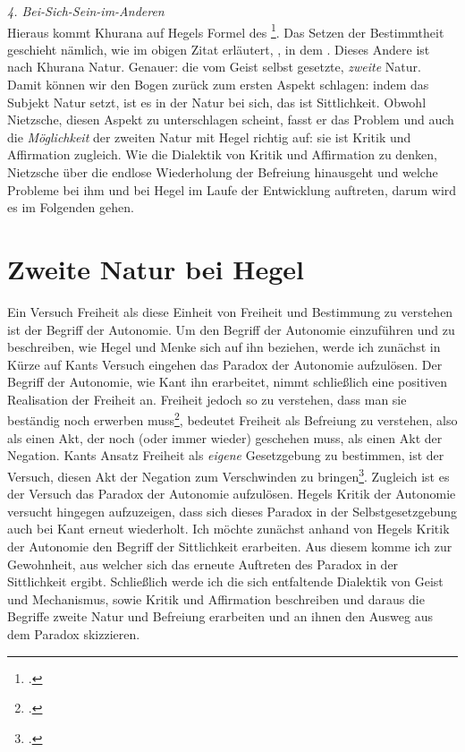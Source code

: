 \documentclass[12pt, a4paper, openany]{report}
\begin{document}
\emph{4. Bei-Sich-Sein-im-Anderen}\\
Hieraus kommt Khurana auf Hegels Formel des \footcite[][283]{khurana_freiheit_2017}.
Das Setzen der Bestimmtheit geschieht nämlich, wie im obigen Zitat erläutert, , in dem . 
Dieses Andere ist nach Khurana Natur. 
Genauer: die vom Geist selbst gesetzte, \emph{zweite} Natur.
Damit können wir den Bogen zurück zum ersten Aspekt schlagen: 
indem das Subjekt Natur setzt, ist es in der Natur bei sich, das ist Sittlichkeit.
Obwohl Nietzsche, diesen Aspekt zu unterschlagen scheint, fasst er das Problem und auch die \emph{Möglichkeit} der zweiten Natur mit Hegel richtig auf: 
sie ist Kritik und Affirmation zugleich.
Wie die Dialektik von Kritik und Affirmation zu denken, Nietzsche über die endlose Wiederholung der Befreiung hinausgeht und welche Probleme bei ihm und bei Hegel im Laufe der Entwicklung auftreten, darum wird es im Folgenden gehen.

\section{Zweite Natur bei Hegel}\label{abschnitt_1}
Ein Versuch Freiheit als diese Einheit von Freiheit und Bestimmung zu verstehen ist der Begriff der Autonomie. 
Um den Begriff der Autonomie einzuführen und zu beschreiben, wie Hegel und Menke sich auf ihn beziehen, werde ich zunächst in Kürze auf Kants Versuch eingehen das Paradox der Autonomie aufzulösen.
Der Begriff der Autonomie, wie Kant ihn erarbeitet, nimmt schließlich eine positiven Realisation der Freiheit an.
Freiheit jedoch so zu verstehen, dass man sie beständig noch erwerben muss\footcite[Vgl.][636]{nietzsche_morgenrote_1999}, bedeutet Freiheit als Befreiung zu verstehen, also als einen Akt, der noch (oder immer wieder) geschehen muss, als einen Akt der Negation.
Kants Ansatz Freiheit als \emph{eigene} Gesetzgebung zu bestimmen, ist der Versuch, diesen Akt der Negation zum Verschwinden zu bringen\footcite[Vgl.][53]{menke_autonomie_2018}.
Zugleich ist es der Versuch das Paradox der Autonomie aufzulösen.
Hegels Kritik der Autonomie versucht hingegen aufzuzeigen, dass sich dieses Paradox in der Selbstgesetzgebung auch bei Kant erneut wiederholt.
Ich möchte zunächst anhand von Hegels Kritik der Autonomie den Begriff der Sittlichkeit erarbeiten.
Aus diesem komme ich zur Gewohnheit, aus welcher sich das erneute Auftreten des Paradox in der Sittlichkeit ergibt.
Schließlich werde ich die sich entfaltende Dialektik von Geist und Mechanismus, sowie Kritik und Affirmation beschreiben und daraus die Begriffe zweite Natur und Befreiung erarbeiten und an ihnen den Ausweg aus dem Paradox skizzieren.
\end{document}

